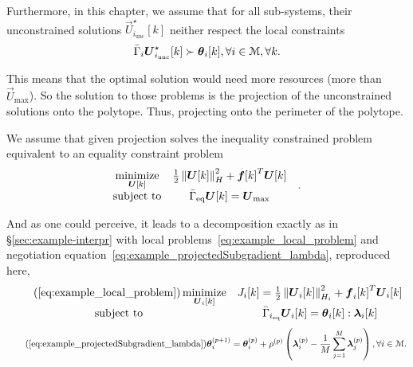 \documentclass[../main.tex]{subfiles}
\begin{document}
Furthermore, in this chapter, we assume that for all sub-systems, their unconstrained solutions $\vec{U}_{i_{\text{unc}}}^{\star}[k]$ neither respect the local constraints
\begin{equation}
\bar{\Gamma}_{i}\vec{U}_{i_{\text{unc}}}^{\star}[k]\succ \thetaik, \forall i\in\set{M}, \forall k.
\end{equation}

This means that the optimal solution would need more resources (more than $\vec{U}_{\max}$).
So the solution to those \qp{} problems is the projection of the unconstrained solutions onto the polytope. Thus, projecting onto the perimeter of the polytope.

We assume that given projection solves the inequality constrained problem equivalent to an equality constraint problem
\begin{equation}
  \label{eq:qp_standard_form_equality}
  \begin{aligned}
    \begin{matrix}
      \mathop{\textrm{minimize}}\limits_{\boldsymbol{U}[k]} &
                                                 \frac{1}{2}\left\lVert\boldsymbol{U}[k]\right\rVert^{2}_{H} + {\boldsymbol{f}[k]}^{T}\boldsymbol{U}[k] &\\
      \mathrm{subject~ to} &
                             \bar{\Gamma}_{\text{eq}}\boldsymbol{U}[k]= {\boldsymbol{U}}_{\text{max}}
    \end{matrix}
  \end{aligned}.
\end{equation}

And as one could perceive, it leads to a decomposition exactly as in \S\ref{sec:example-interpr}
with local problems~\eqref{eq:example_local_problem} and negotiation equation~\eqref{eq:example_projectedSubgradient_lambda}, reproduced here,
\begin{equation}
  \begin{matrix}
  \label{eq:example_local_problem_reprise}
  \tag{\ref*{eq:example_local_problem}}
    \minimize\limits_{\vec{U}_{i}[k]}&\obji=\frac{1}{2}\norm{\vec{U}_{i}[k]}^{2}_{H_{i}} + {\vec{f}_{i}[k]}^{T}\vec{U}_{i}[k]\\
    \mathrm{subject~ to} & \bar{\Gamma}_{i_{\text{eq}}}\vec{U}_{i}[k] = \thetaik:\lambdaik
  \end{matrix}
\end{equation}
\begin{equation}
  \label{eq:example_projectedSubgradient_lambda_reprise}
  \tag{\ref*{eq:example_projectedSubgradient_lambda}}
 \thetai\pplusone=\thetai\p+\rho\p\left(\lambdai\p-\frac{1}{M}\sum_{j=1}^{M}\vec{\lambda}_j\p\right),\forall i\in\set{M}.
\end{equation}
\end{document}
